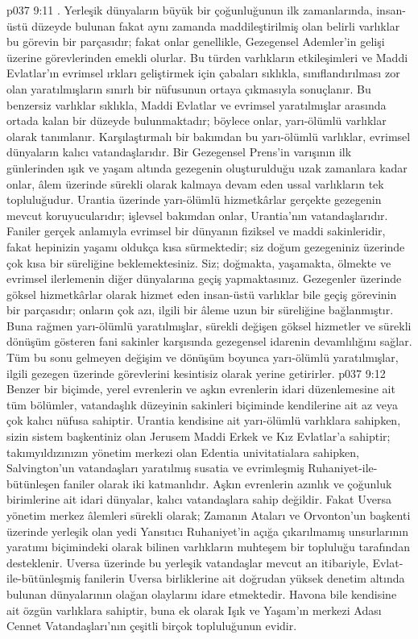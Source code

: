 \vs p037 9:11 . Yerleşik dünyaların büyük bir çoğunluğunun ilk zamanlarında, insan\hyp{}üstü düzeyde bulunan fakat aynı zamanda maddileştirilmiş olan belirli varlıklar bu görevin bir parçasıdır; fakat onlar genellikle, Gezegensel Ademler’in gelişi üzerine görevlerinden emekli olurlar. Bu türden varlıkların etkileşimleri ve Maddi Evlatlar’ın evrimsel ırkları geliştirmek için çabaları sıklıkla, sınıflandırılması zor olan yaratılmışların sınırlı bir nüfusunun ortaya çıkmasıyla sonuçlanır. Bu benzersiz varlıklar sıklıkla, Maddi Evlatlar ve evrimsel yaratılmışlar arasında ortada kalan bir düzeyde bulunmaktadır; böylece onlar, yarı\hyp{}ölümlü varlıklar olarak tanımlanır. Karşılaştırmalı bir bakımdan bu yarı\hyp{}ölümlü varlıklar, evrimsel dünyaların kalıcı vatandaşlarıdır. Bir Gezegensel Prens’in varışının ilk günlerinden ışık ve yaşam altında gezegenin oluşturulduğu uzak zamanlara kadar onlar, âlem üzerinde sürekli olarak kalmaya devam eden ussal varlıkların tek topluluğudur. Urantia üzerinde yarı\hyp{}ölümlü hizmetkârlar gerçekte gezegenin mevcut koruyucularıdır; işlevsel bakımdan onlar, Urantia’nın vatandaşlarıdır. Faniler gerçek anlamıyla evrimsel bir dünyanın fiziksel ve maddi sakinleridir, fakat hepinizin yaşamı oldukça kısa sürmektedir; siz doğum gezegeniniz üzerinde çok kısa bir süreliğine beklemektesiniz. Siz; doğmakta, yaşamakta, ölmekte ve evrimsel ilerlemenin diğer dünyalarına geçiş yapmaktasınız. Gezegenler üzerinde göksel hizmetkârlar olarak hizmet eden insan\hyp{}üstü varlıklar bile geçiş görevinin bir parçasıdır; onların çok azı, ilgili bir âleme uzun bir süreliğine bağlanmıştır. Buna rağmen yarı\hyp{}ölümlü yaratılmışlar, sürekli değişen göksel hizmetler ve sürekli dönüşüm gösteren fani sakinler karşısında gezegensel idarenin devamlılığını sağlar. Tüm bu sonu gelmeyen değişim ve dönüşüm boyunca yarı\hyp{}ölümlü yaratılmışlar, ilgili gezegen üzerinde görevlerini kesintisiz olarak yerine getirirler.
\vs p037 9:12 Benzer bir biçimde, yerel evrenlerin ve aşkın evrenlerin idari düzenlemesine ait tüm bölümler, vatandaşlık düzeyinin sakinleri biçiminde kendilerine ait az veya çok kalıcı nüfusa sahiptir. Urantia kendisine ait yarı\hyp{}ölümlü varlıklara sahipken, sizin sistem başkentiniz olan Jerusem Maddi Erkek ve Kız Evlatlar’a sahiptir; takımyıldızınızın yönetim merkezi olan Edentia univitatialara sahipken, Salvington’un vatandaşları yaratılmış susatia ve evrimleşmiş Ruhaniyet\hyp{}ile\hyp{}bütünleşen faniler olarak iki katmanlıdır. Aşkın evrenlerin azınlık ve çoğunluk birimlerine ait idari dünyalar, kalıcı vatandaşlara sahip değildir. Fakat Uversa yönetim merkez âlemleri sürekli olarak; Zamanın Ataları ve Orvonton’un başkenti üzerinde yerleşik olan yedi Yansıtıcı Ruhaniyet’in açığa çıkarılmamış unsurlarının yaratımı biçimindeki  olarak bilinen varlıkların muhteşem bir topluluğu tarafından desteklenir. Uversa üzerinde bu yerleşik vatandaşlar mevcut an itibariyle, Evlat\hyp{}ile\hyp{}bütünleşmiş fanilerin Uversa birliklerine ait doğrudan yüksek denetim altında bulunan dünyalarının olağan olaylarını idare etmektedir. Havona bile kendisine ait özgün varlıklara sahiptir, buna ek olarak Işık ve Yaşam’ın merkezi Adası Cennet Vatandaşları’nın çeşitli birçok topluluğunun evidir.

